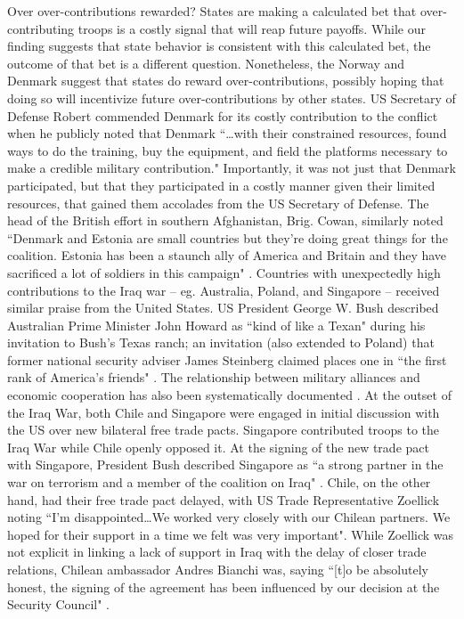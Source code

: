 \documentclass[12pt,letterpaper]{article}
\begin{document}
	Over over-contributions rewarded? States are making a calculated bet that over-contributing troops is a costly signal that will reap future payoffs. While our finding suggests that state behavior is consistent with this calculated bet, the outcome of that bet is a different question. Nonetheless, the Norway and Denmark suggest that states do reward over-contributions, possibly hoping that doing so will incentivize future over-contributions by other states. US Secretary of Defense Robert \citet{gates_securitydefenseagenda_2011} commended Denmark for its costly contribution to the conflict when he publicly noted that Denmark ``\ldots with their constrained resources, found ways to do the training, buy the equipment, and field the platforms necessary to make a credible military contribution." Importantly, it was not just that Denmark participated, but that they participated in a costly manner given their limited resources, that gained them accolades from the US Secretary of Defense. The head of the British effort in southern Afghanistan, Brig. Cowan, similarly noted ``Denmark and Estonia are small countries but they're doing great things for the coalition. Estonia has been a staunch ally of America and Britain and they have sacrificed a lot of soldiers in this campaign" \citep{druzin_tinyestoniakeen_2009}. Countries with unexpectedly high contributions to the Iraq war -- eg. Australia, Poland, and Singapore -- received similar praise from the United States. US President George W. Bush described Australian Prime Minister John Howard as ``kind of like a Texan" during his invitation to Bush's Texas ranch; an invitation (also extended to Poland) that former national security adviser James Steinberg claimed places one in ``the first rank of America's friends" \citep{sanger_meanwhilebackranch_2003}. The relationship between military alliances and economic cooperation has also been systematically documented \citep{long_tradingsecuritymilitary_2006}. At the outset of the Iraq War, both Chile and Singapore were engaged in initial discussion with the US over new bilateral free trade pacts. Singapore contributed troops to the Iraq War while Chile openly opposed it. At the signing of the new trade pact with Singapore, President Bush described Singapore as ``a strong partner in the war on terrorism and a member of the coalition on Iraq" \citep{armstrong_alliesrewardedtrade_2003}. Chile, on the other hand, had their free trade pact delayed, with US Trade Representative Zoellick noting ``I'm disappointed\ldots We worked very closely with our Chilean partners. We hoped for their support in a time we felt was very important". While Zoellick was not explicit in linking a lack of support in Iraq with the delay of closer trade relations, Chilean ambassador Andres Bianchi was, saying ``[t]o be absolutely honest, the signing of the agreement has been influenced by our decision at the Security Council" \citep{armstrong_alliesrewardedtrade_2003}.
\end{document}
